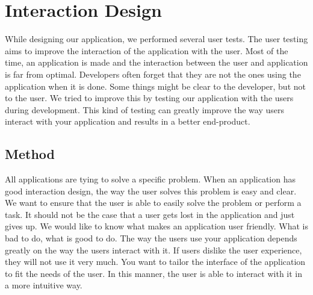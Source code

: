 \section{Interaction Design}
While designing our application, we performed several user tests. The user testing aims to improve the interaction of the application with the user. Most of the time, an application is made and the interaction between the user and application is far from optimal. Developers often forget that they are not the ones using the application when it is done. Some things might be clear to the developer, but not to the user. We tried to improve this by testing our application with the users during development. This kind of testing can greatly improve the way users interact with your application and results in a better end-product.
\subsection{Method}
All applications are tying to solve a specific problem. When an application has good interaction design, the way the user solves this problem is easy and clear. We want to ensure that the user is able to easily solve the problem or perform a task. It should not be the case that a user gets lost in the application and just gives up. We would like to know what makes an application user friendly. What is bad to do, what is good to do. The way the users use your application depends greatly on the way the users interact with it. If users dislike the user experience, they will not use it very much. You want to tailor the interface of the application to fit the needs of the user. In this manner, the user is able to interact with it in a more intuitive way.\\

